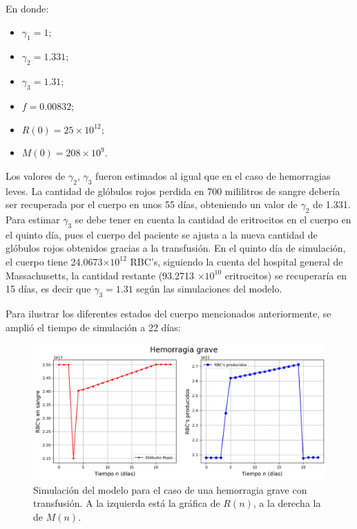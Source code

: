 En donde:
\begin{itemize}
    \item $\gamma_1=1$;
    \item $\gamma_2=1.331$;
    \item $\gamma_3=1.31$;
    \item $f=0.00832$;
    \item $R(0) = 25\times 10^{12};$
    \item $M(0) = 208 \times 10^{9}.$
\end{itemize}
Los valores de $\gamma_2$, $\gamma_3$ fueron estimados al igual que en el caso de hemorragias leves. La cantidad de glóbulos rojos perdida en 700 mililitros de sangre debería ser recuperada por el cuerpo en unos 55 días, obteniendo un valor de $\gamma_2$ de 1.331. Para estimar $\gamma_3$ se debe tener en cuenta la cantidad de eritrocitos en el cuerpo en el quinto día, pues el cuerpo del paciente se ajusta a la nueva cantidad de glóbulos rojos obtenidos gracias a la transfusión. En el quinto día de simulación, el cuerpo tiene 24.0673$\times 10^{12}$ RBC's, siguiendo la cuenta del hospital general de Massachusetts, la cantidad restante (93.2713 $\times 10^{10}$ eritrocitos) se recuperaría en 15 días, es decir que $\gamma_3 = 1.31$ según las simulaciones del modelo.

Para ilustrar los diferentes estados del cuerpo mencionados anteriormente, se amplió el tiempo de simulación a 22 días: 

\begin{figure}[H]
    \centering
    \captionsetup{justification=centering}
    \includegraphics[scale=0.534]{figures/HemoGrave.png}
    \caption{Simulación del modelo para el caso de una hemorragia grave con transfusión. A la izquierda está la gráfica de $R(n)$, a la derecha la de $M(n)$.}
    \label{sec:variaciones:fig:HemoLeveG13}
\end{figure}